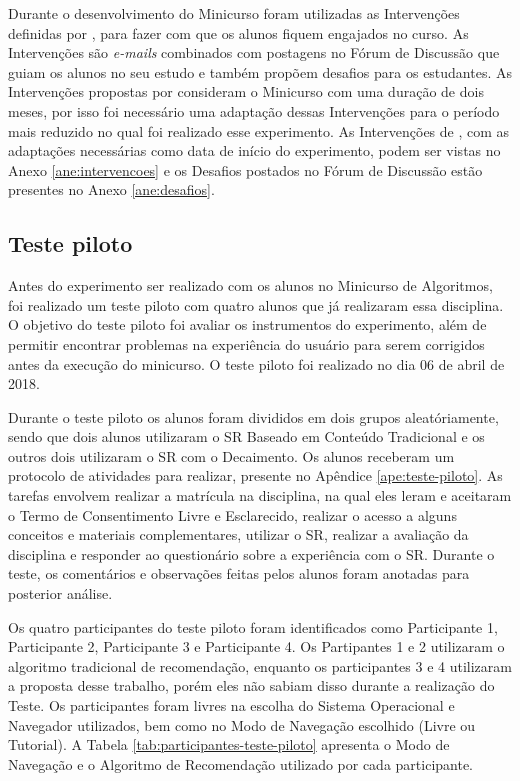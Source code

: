 Durante o desenvolvimento do Minicurso foram utilizadas as Intervenções definidas por , para
fazer com que os alunos fiquem engajados no curso. As Intervenções são \textit{e-mails} combinados com postagens no Fórum de Discussão
que guiam os alunos no seu estudo e também propõem desafios para os estudantes. As Intervenções propostas por 
consideram o Minicurso com uma duração de dois meses, por isso foi necessário uma adaptação dessas Intervenções para o período
mais reduzido no qual foi realizado esse experimento. As Intervenções de , com as adaptações
necessárias como data de início do experimento, podem ser vistas no Anexo \ref{ane:intervencoes} e os Desafios postados
no Fórum de Discussão estão presentes no Anexo \ref{ane:desafios}.

\subsection{Teste piloto}\label{section:planejamento-teste-piloto}

Antes do experimento ser realizado com os alunos no Minicurso de Algoritmos, foi realizado um teste piloto com
quatro alunos que já realizaram essa disciplina. O objetivo do teste piloto foi avaliar os instrumentos do experimento,
além de permitir encontrar problemas na experiência do usuário para serem corrigidos antes da execução do minicurso. O teste piloto
foi realizado no dia 06 de abril de 2018.

Durante o teste piloto os alunos foram divididos em dois grupos aleatóriamente, sendo que dois alunos utilizaram o SR
Baseado em Conteúdo Tradicional e os outros dois utilizaram o SR com o Decaimento. Os alunos receberam
um protocolo de atividades para realizar, presente no Apêndice \ref{ape:teste-piloto}. As tarefas envolvem
realizar a matrícula na disciplina, na qual eles leram e aceitaram o Termo de Consentimento Livre e Esclarecido, realizar
o acesso a alguns conceitos e materiais complementares, utilizar o SR, realizar a avaliação da disciplina e responder
ao questionário sobre a experiência com o SR. Durante o teste, os comentários e observações feitas pelos alunos foram
anotadas para posterior análise.

Os quatro participantes do teste piloto foram identificados como Participante 1, Participante 2,
Participante 3 e Participante 4. Os Partipantes 1 e 2 utilizaram o algoritmo tradicional de recomendação, enquanto os
participantes 3 e 4 utilizaram a proposta desse trabalho, porém eles não sabiam disso durante a realização do Teste. Os
participantes foram livres na escolha do Sistema Operacional e Navegador utilizados, bem como no Modo de Navegação
escolhido (Livre ou Tutorial). A Tabela \ref{tab:participantes-teste-piloto} apresenta o Modo de Navegação e o Algoritmo
de Recomendação utilizado por cada participante.

